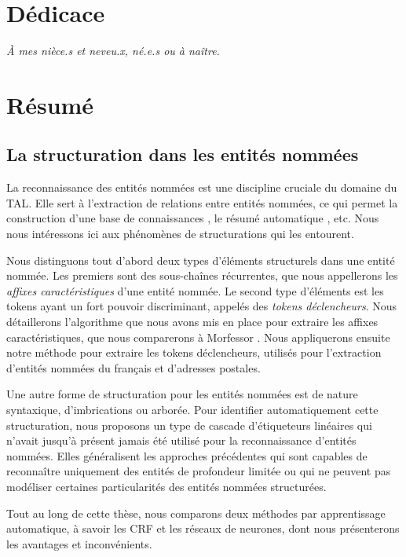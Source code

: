 \documentclass[12pt,a4paper,times,twoside,openright]{report}
\begin{document}
\chapter*{Dédicace}
\begin{flushright}
\textit{À mes nièce.s et neveu.x, né.e.s ou à naître.}
\end{flushright}



\chapter*{Résumé}
\section*{La structuration dans les entités nommées}
La reconnaissance des entités nommées est une discipline cruciale du domaine du TAL. Elle sert à l'extraction de relations entre entités nommées, ce qui permet la construction d'une base de connaissances \citep{surdeanu2014overview}, le résumé automatique \citep{nobata2002summarization}, etc. Nous nous intéressons ici aux phénomènes de structurations qui les entourent.

Nous distinguons tout d'abord deux types d'éléments structurels dans une entité nommée. Les premiers sont des sous-chaînes récurrentes, que nous appellerons les \emph{affixes caractéristiques} d'une entité nommée. Le second type d'éléments est les tokens ayant un fort pouvoir discriminant, appelés des \emph{tokens déclencheurs}. Nous détaillerons l'algorithme que nous avons mis en place pour extraire les affixes caractéristiques, que nous comparerons à Morfessor \citep{creutz2005unsupervised}. Nous appliquerons ensuite notre méthode pour extraire les tokens déclencheurs, utilisés pour l'extraction d'entités nommées du français et d'adresses postales.

Une autre forme de structuration pour les entités nommées est de nature syntaxique, d'imbrications ou arborée. Pour identifier automatiquement cette structuration, nous proposons un type de cascade d'étiqueteurs linéaires qui n'avait jusqu'à présent jamais été utilisé pour la reconnaissance d'entités nommées. Elles généralisent les approches précédentes qui sont capables de reconnaître uniquement des entités de profondeur limitée ou qui ne peuvent pas modéliser certaines particularités des entités nommées structurées.

Tout au long de cette thèse, nous comparons deux méthodes par apprentissage automatique, à savoir les CRF et les réseaux de neurones, dont nous présenterons les avantages et inconvénients.
\end{document}

